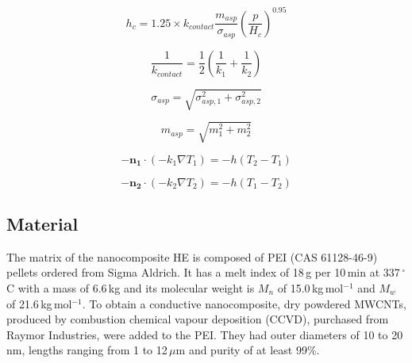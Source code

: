 \documentclass[review,times,sagev,doublespace]{sagej}
\begin{document}
\begin{equation}
h_c = 1.25 \times k_{contact} \frac{m_{asp}}{\sigma_{asp}} \left( \frac{p}{H_c} \right)^{0.95}
\label{eq:cmy_correlation}
\end{equation}

\begin{equation}
\frac{1}{k_{contact}} = \frac{1}{2} \left( \frac{1}{k_1} + \frac{1}{k_2} \right)
\label{eq:contact_conductivity}
\end{equation}

\begin{equation}
\sigma_{asp} = \sqrt{\sigma_{asp,1}^2 + \sigma_{asp,2}^2}
\label{eq:asperities_average_height}
\end{equation}

\begin{equation}
m_{asp} = \sqrt{m_1^2 + m_2^2}
\label{eq:asperities_slope}
\end{equation}

\begin{equation}
-\mathbf{n_1} \cdot \left( -k_1 \nabla T_1 \right) = -h \left( T_2 -T_1 \right)
\label{eq:contact_conductance_surface1}
\end{equation}

\begin{equation}
-\mathbf{n_2} \cdot \left( -k_2 \nabla T_2 \right) = -h \left( T_1 -T_2 \right)
\label{eq:contact_conductance_surface2}
\end{equation}

	\subsection{Material}

The matrix of the nanocomposite HE is composed of PEI (CAS 61128-46-9) pellets ordered from Sigma Aldrich. 
It has a melt index of 18\,g per 10\,min at 337\,$^{\circ}$C with a mass of 6.6\,kg and its molecular weight is $M_n$ of \mbox{15.0\,kg\,mol$^{-1}$} and $M_w$ of \mbox{21.6\,kg\,mol$^{-1}$}. 
To obtain a conductive nanocomposite, dry powdered \mbox{MWCNTs}, produced by combustion chemical vapour deposition (CCVD), purchased from Raymor Industries, were added to the PEI. 
They had outer diameters of 10 to 20\,nm, lengths ranging from 1 to \mbox{12\,$\mu$m} and purity of at least 99\%. 
\end{document}
